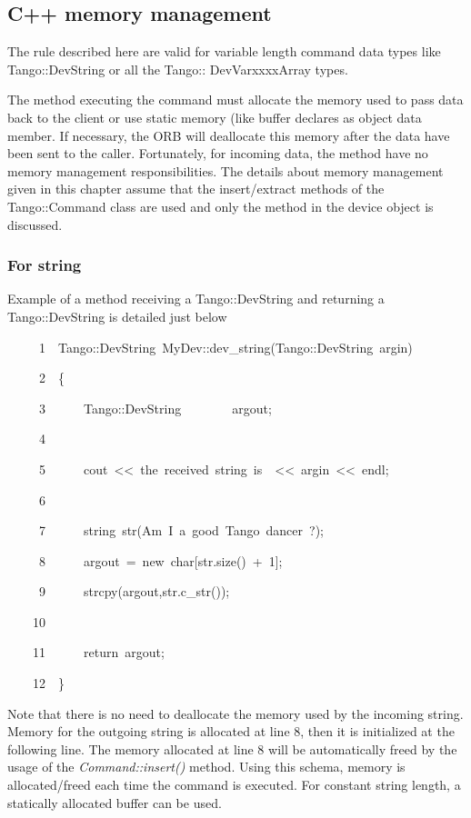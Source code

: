 \subsection{C++ memory management}

The rule described here are valid for variable length command data
types like Tango::DevString or all the Tango:: DevVarxxxxArray types.

The method executing the command must allocate the memory used to
pass data back to the client or use static memory (like buffer declares
as object data member. If necessary, the ORB will deallocate this
memory after the data have been sent to the caller. Fortunately, for
incoming data, the method have no memory management
responsibilities. The details about memory management given in this
chapter assume that the insert/extract methods of the Tango::Command
class are used and only the method in the device object is discussed.


\subsubsection{For string}

Example of a method receiving a Tango::DevString
and returning a Tango::DevString is detailed just below


\begin{lyxcode}
~~~~~1~~Tango::DevString~MyDev::dev\_string(Tango::DevString~argin)

~~~~~2~~\{

~~~~~3~~~~~~Tango::DevString~~~~~~~~argout;

~~~~~4~~

~~~~~5~~~~~~cout~<\textcompwordmark{}<~\textquotedbl{}the~received~string~is~\textquotedbl{}~<\textcompwordmark{}<~argin~<\textcompwordmark{}<~endl;

~~~~~6~~~~~~~~~~

~~~~~7~~~~~~string~str(\textquotedbl{}Am~I~a~good~Tango~dancer~?\textquotedbl{});

~~~~~8~~~~~~argout~=~new~char{[}str.size()~+~1{]};

~~~~~9~~~~~~strcpy(argout,str.c\_str());

~~~~10~~~~~~~~~~

~~~~11~~~~~~return~argout;

~~~~12~~\}
\end{lyxcode}


Note that there is no need to deallocate the memory used by the incoming
string. Memory for the outgoing string is allocated at line 8, then
it is initialized at the following line. The memory allocated at line
8 will be automatically freed by the usage of the \emph{Command::insert()}
method. Using this schema, memory is allocated/freed
each time the command is executed. For constant string length, a statically
allocated buffer can be used.

